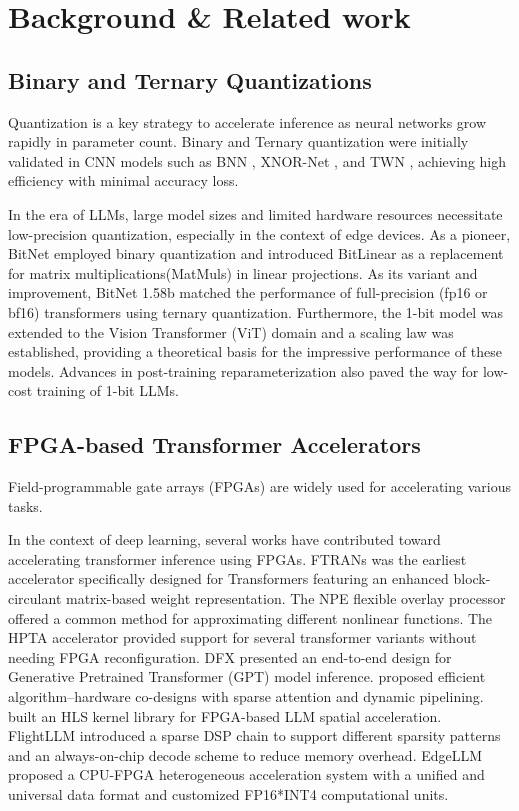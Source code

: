 \section{Background \& Related work}
\subsection{Binary and Ternary Quantizations}
Quantization is a key strategy to accelerate inference as neural networks grow rapidly in parameter count. Binary and Ternary quantization were initially validated in CNN models such as BNN \cite{BNN}, XNOR-Net \cite{Xnor}, and TWN \cite{TWN}, achieving high efficiency with minimal accuracy loss.

In the era of LLMs, large model sizes and limited hardware resources necessitate low-precision quantization, especially in the context of edge devices. As a pioneer, BitNet\cite{bitnet} employed binary quantization and introduced BitLinear as a replacement for matrix multiplications(MatMuls) in linear projections. As its variant and improvement, BitNet 1.58b\cite{bitnet1.58} matched the performance of full-precision (fp16 or bf16) transformers using ternary quantization. Furthermore, the 1-bit model was extended to the Vision Transformer (ViT) domain \cite{vit1.58} and a scaling law \cite{1bittheory} was established, providing a theoretical basis for the impressive performance of these models. Advances in post-training reparameterization \cite{shiftaddllm} also paved the way for low-cost training of 1-bit LLMs.

\vspace{-1.5mm}
\subsection{FPGA-based Transformer Accelerators}
\vspace{-0.5mm}
Field-programmable gate arrays (FPGAs) are widely used for accelerating various tasks.

In the context of deep learning, several works have contributed toward accelerating transformer inference using FPGAs. FTRANs\cite{FTRANs} was the earliest accelerator specifically designed for Transformers featuring an enhanced block-circulant matrix-based weight representation. The NPE\cite{NPE} flexible overlay processor offered a common method for approximating different nonlinear functions. The HPTA\cite{HPTA} accelerator provided support for several transformer variants without needing FPGA reconfiguration. DFX\cite{DFX} presented an end-to-end design for Generative Pretrained Transformer (GPT) model inference. \cite{sparse_atten} proposed efficient algorithm–hardware co-designs with sparse attention and dynamic pipelining.  \cite{spatial} built an HLS kernel library for FPGA-based LLM spatial acceleration. FlightLLM\cite{flightllm} introduced a sparse DSP chain to support different sparsity patterns and an always-on-chip decode scheme to reduce memory overhead. EdgeLLM\cite{edgellm} proposed a CPU-FPGA heterogeneous acceleration system with a unified and universal data format and customized FP16*INT4 computational units.

